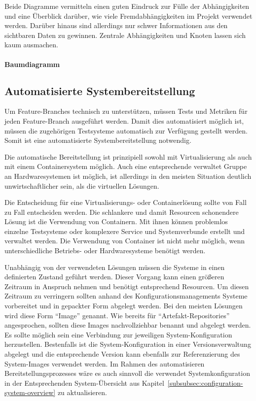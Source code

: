 Beide Diagramme vermitteln einen guten Eindruck zur Fülle der Abhängigkeiten und eine Überblick darüber, wie viele Fremdabhängigkeiten im Projekt verwendet werden. Darüber hinaus sind allerdings nur schwer Informationen aus den sichtbaren Daten zu gewinnen. Zentrale Abhängigkeiten und Knoten lassen sich kaum ausmachen.

\paragraph{Baumdiagramm}

\subsection{Automatisierte Systembereitstellung}

Um Feature-Branches technisch zu unterstützen, müssen Tests und Metriken für jeden Feature-Branch ausgeführt werden. Damit dies automatisiert möglich ist, müssen die zugehörigen Testsysteme automatisch zur Verfügung gestellt werden. Somit ist eine automatisierte Systembereitstellung notwendig.

Die automatische Bereitstellung ist prinzipiell sowohl mit Virtualisierung als auch mit einem Containersystem möglich. Auch eine entsprechende verwaltet Gruppe an Hardwaresystemen ist möglich, ist allerdings in den meisten Situation deutlich unwirtschaftlicher sein, als die virtuellen Lösungen.

Die Entscheidung für eine Virtualisierungs- oder Containerlösung sollte von Fall zu Fall entscheiden werden. Die schlankere und damit Resourcen schonendere Lösung ist die Verwendung von Containern. Mit ihnen können problemlos einzelne Testsysteme oder komplexere Service und Systemverbunde erstellt und verwaltet werden. Die Verwendung von Container ist nicht mehr möglich, wenn unterschiedliche Betriebs- oder Hardwaresysteme benötigt werden.

Unabhängig von der verwendeten Lösungen müssen die Systeme in einen definierten Zustand geführt werden. Dieser Vorgang kann einen größeren Zeitraum in Anspruch nehmen und benötigt entsprechend Resourcen. Um diesen Zeitraum zu verringern sollten anhand des Konfigurationsmanagements Systeme vorbereitet und in gepackter Form abgelegt werden. Bei den meisten Lösungen wird diese Form ``Image'' genannt. Wie bereits für ``Artefakt-Repositories'' angesprochen, sollten diese Images nachvollziehbar benannt und abgelegt werden. Es sollte möglich sein eine Verbindung zur jeweiligen System-Konfiguration herzustellen. Bestenfalls ist die System-Konfiguration in einer Versionsverwaltung abgelegt und die entsprechende Version kann ebenfalls zur Referenzierung des System-Images verwendet werden. Im Rahmen des automatisieren Bereitstellungsprozesses wäre es auch sinnvoll die verwendet Systemkonfiguration in der Entsprechenden System-Übersicht aus Kapitel~\ref{subsubsec:configuration-system-overview} zu aktualisieren.

